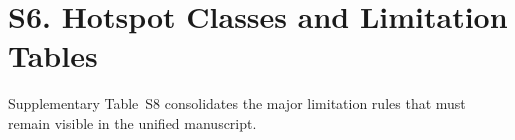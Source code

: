 \section{S6. Hotspot Classes and Limitation Tables}

Supplementary Table~S8 consolidates the major limitation rules that must remain visible in the unified manuscript.



